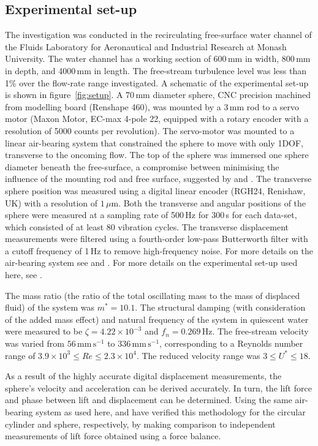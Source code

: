 \documentclass[3p]{elsarticle}
\begin{document}
\subsection{Experimental set-up}%
The investigation was conducted in the recirculating free-surface
water channel of the Fluids Laboratory for Aeronautical and Industrial
Research at Monash University. The water channel has a working section
of 600\,mm in width, 800\,mm in depth, and 4000\,mm in length. The
free-stream turbulence level was less than 1\% over the flow-rate
range investigated. A schematic of the experimental set-up is shown in
figure~\ref{fig:setup}. A 70\,mm diameter sphere, CNC precision
machined from modelling board (Renshape 460), was mounted by a 3\,mm
rod to a servo motor (Maxon Motor, EC-max 4-pole 22, equipped with a
rotary encoder with a resolution of 5000 counts per revolution). The
servo-motor was mounted to a linear air-bearing system that
constrained the sphere to move with only 1DOF, transverse to the
oncoming flow. The top of the sphere was immersed one sphere diameter
beneath the free-surface, a compromise between minimising the
influence of the mounting rod and free surface, suggested by
\citet{Govardhan2005} and \citet{Sareen2018c}. The transverse sphere position was
measured using a digital linear encoder (RGH24, Renishaw, UK) with
a resolution of $1\,\mu$m. Both the transverse and angular positions of
the sphere were measured at a sampling rate of 500\,Hz for 300\,s for
each data-set, which consisted of at least 80 vibration cycles. The transverse displacement measurements were filtered
using a fourth-order low-pass Butterworth filter with a cutoff
frequency of 1\,Hz to remove high-frequency noise. For more details on
the air-bearing system see \citet{Nemes2012} and \citet{Zhao2014}. For
more details on the experimental set-up used here, see
\citet{McQueen2020}.

The mass ratio (the ratio of the total oscillating mass to the mass of
displaced fluid) of the system was $m^*= 10.1$. The structural damping
(with consideration of the added mass effect) and natural frequency of
the system in quiescent water were measured to be
$\zeta=4.22\times10^{-3}$ and $f_n=0.269$\,Hz. The
free-stream velocity was varied from $56\, \mathrm{mm\,s^{-1}}$ to
$336\, \mathrm{mm\,s^{-1}}$, corresponding to a Reynolds number range
of $3.9\times10^3 \leqslant Re \leqslant 2.3\times10^4$. The reduced
velocity range was $3 \leqslant U^* \leqslant 18$.

As a result of the highly accurate digital displacement measurements,
the sphere's velocity and acceleration can be derived accurately. 
In turn, the lift force and phase between lift and
displacement can be determined. Using the same air-bearing system as
used here, \citet{Zhao2018} and \citet{Sareen2018} have verified this
methodology for the circular cylinder and sphere, respectively, by
making comparison to independent measurements of lift force obtained
using a force balance.
\end{document}
